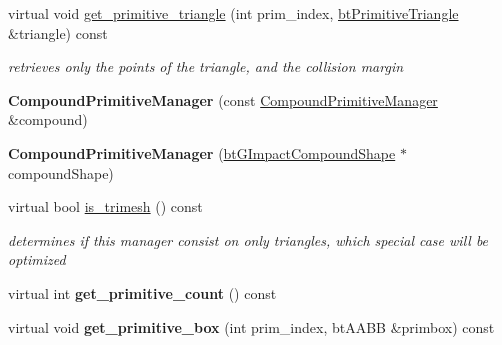 \begin{DoxyCompactItemize}
virtual void \hyperlink{classbtGImpactCompoundShape_1_1CompoundPrimitiveManager_ae6937811f4217de508b7fa9304212a3d}{get\+\_\+primitive\+\_\+triangle} (int prim\+\_\+index, \hyperlink{classbtPrimitiveTriangle}{bt\+Primitive\+Triangle} \&triangle) const
\begin{DoxyCompactList}\small\item\em retrieves only the points of the triangle, and the collision margin \end{DoxyCompactList}\item 
\mbox{\label{classbtGImpactCompoundShape_1_1CompoundPrimitiveManager_a5539cca68e6315d315bbc391373c5c00}} 
{\bfseries Compound\+Primitive\+Manager} (const \hyperlink{classbtGImpactCompoundShape_1_1CompoundPrimitiveManager}{Compound\+Primitive\+Manager} \&compound)
\item 
\mbox{\label{classbtGImpactCompoundShape_1_1CompoundPrimitiveManager_a52742fa7366e3b923cfbd5fc64a3e3a7}} 
{\bfseries Compound\+Primitive\+Manager} (\hyperlink{classbtGImpactCompoundShape}{bt\+G\+Impact\+Compound\+Shape} $\ast$compound\+Shape)
\item 
\mbox{\label{classbtGImpactCompoundShape_1_1CompoundPrimitiveManager_a8d1c24ad98166744555f34b2b65bca8d}} 
virtual bool \hyperlink{classbtGImpactCompoundShape_1_1CompoundPrimitiveManager_a8d1c24ad98166744555f34b2b65bca8d}{is\+\_\+trimesh} () const
\begin{DoxyCompactList}\small\item\em determines if this manager consist on only triangles, which special case will be optimized \end{DoxyCompactList}\item 
\mbox{\label{classbtGImpactCompoundShape_1_1CompoundPrimitiveManager_a45ad8b8bd0ef21f12bf8d459bf1cc4e7}} 
virtual int {\bfseries get\+\_\+primitive\+\_\+count} () const
\item 
\mbox{\label{classbtGImpactCompoundShape_1_1CompoundPrimitiveManager_a86c14dffc631e4507c2de85bebcdd788}} 
virtual void {\bfseries get\+\_\+primitive\+\_\+box} (int prim\+\_\+index, bt\+A\+A\+BB \&primbox) const

\end{DoxyCompactItemize}
